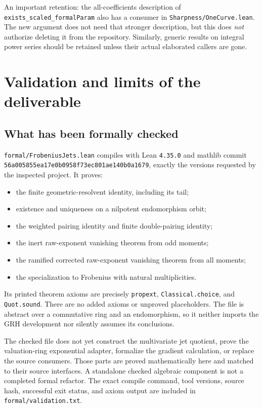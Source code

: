 \documentclass[11pt,letterpaper]{article}
\theoremstyle{remark}
\newcommand{\code}[1]{{\small\nolinkurl{#1}}}
\begin{document}
An important retention: the all-coefficients description of
\code{exists_scaled_formalParam} also has a consumer in
\code{Sharpness/OneCurve.lean}. The new argument does not need that stronger
description, but this does \emph{not} authorize deleting it from the repository.
Similarly, generic results on integral power series should be retained unless
their actual elaborated callers are gone.

\section{Validation and limits of the deliverable}
\label{sec:validation}

\subsection{What has been formally checked}

\code{formal/FrobeniusJets.lean} compiles with
Lean \code{4.35.0} and mathlib commit
\code{56a005855ea17e0b0958f73ec801ae140b0a1679}, exactly the versions requested
by the inspected project. It proves:
\begin{itemize}
\item the finite geometric-resolvent identity, including its tail;
\item existence and uniqueness on a nilpotent endomorphism orbit;
\item the weighted pairing identity and finite double-pairing identity;
\item the inert raw-exponent vanishing theorem from odd moments;
\item the ramified corrected raw-exponent vanishing theorem from all moments;
\item the specialization to Frobenius with natural multiplicities.
\end{itemize}
Its printed theorem axioms are precisely
\code{propext}, \code{Classical.choice}, and \code{Quot.sound}.
There are no added axioms or unproved placeholders. The file is abstract over a
commutative ring and an endomorphism, so it neither imports the GRH development
nor silently assumes its conclusions.

The checked file does not yet construct the multivariate jet quotient, prove the
valuation-ring exponential adapter, formalize the gradient calculation, or
replace the source consumers. Those parts are proved mathematically here and
matched to their source interfaces. A standalone checked algebraic component is
not a completed formal refactor. The exact compile command, tool versions,
source hash, successful exit status, and axiom output are included in
\code{formal/validation.txt}.
\end{document}
